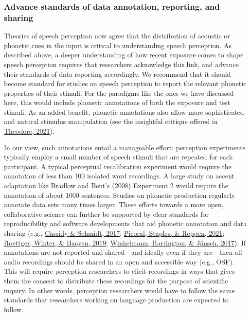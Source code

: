 \documentclass[
  11pt,
  english,
  man,floatsintext]{apa6}
\begin{document}
\hypertarget{advance-standards-of-data-annotation-reporting-and-sharing}{%
\subsubsection{Advance standards of data annotation, reporting, and sharing}\label{advance-standards-of-data-annotation-reporting-and-sharing}}

Theories of speech perception now agree that the distribution of acoustic or phonetic cues in the input is critical to understanding speech perception. As described above, a deeper understanding of how recent exposure comes to shape speech perception requires that researchers acknowledge this link, and advance their standards of data reporting accordingly. We recommend that it should become standard for studies on speech perception to report the relevant phonetic properties of their stimuli. For the paradigms like the ones we have discussed here, this would include phonetic annotations of both the exposure and test stimuli. As an added benefit, phonetic annotations also allow more sophisticated and natural stimulus manipulation (see the insightful critique offered in \protect\hyperlink{ref-theodore2021}{Theodore, 2021}).

In our view, such annotations entail a manageable effort: perception experiments typically employ a small number of speech stimuli that are repeated for each participant. A typical perceptual recalibration experiment would require the annotation of less than 100 isolated word recordings. A large study on accent adaptation like Bradlow and Bent's (2008) Experiment 2 would require the annotation of about 1000 sentences. Studies on phonetic production regularly annotate data sets many times larger. These efforts towards a more open, collaborative science can further be supported by clear standards for reproducibility and software developments that aid phonetic annotation and data sharing (e.g., \protect\hyperlink{ref-cassidy-schmidt2017}{Cassidy \& Schmidt, 2017}; \protect\hyperlink{ref-picoral2021}{Picoral, Staples, \& Reppen, 2021}; \protect\hyperlink{ref-roettger2019}{Roettger, Winter, \& Baayen, 2019}; \protect\hyperlink{ref-winkelmann2017}{Winkelmann, Harrington, \& Jänsch, 2017}). If annotations are not reported and shared---and ideally even if they are---then all audio recordings should be shared in an open and accessible way (e.g., OSF). This will require perception researchers to elicit recordings in ways that gives them the consent to distribute these recordings for the purpose of scientific inquiry. In other words, perception researchers would have to follow the same standards that researchers working on language production are expected to follow.
\end{document}
